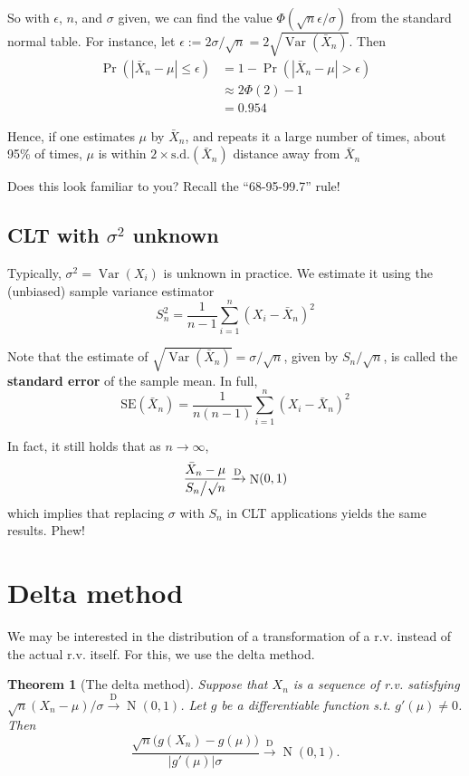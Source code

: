 \documentclass[
]{book}
\DeclareMathOperator{\Var}{Var}
\DeclareMathOperator{\N}{N}
\newtheorem{theorem}{Theorem}[chapter]
\theoremstyle{definition}
\theoremstyle{definition}
\theoremstyle{definition}
\theoremstyle{definition}
\theoremstyle{remark}
\begin{document}
So with \(\epsilon\), \(n\), and \(\sigma\) given, we can find the value \(\Phi(\sqrt{n}\epsilon/\sigma)\) from the standard normal table.
For instance, let \(\epsilon := 2\sigma/\sqrt{n} = 2 \sqrt{\Var(\bar X_n)}\).
Then
\[
\begin{aligned}
\Pr(|\bar X_n-\mu| \leq \epsilon) 
&= 1 - \Pr(|\bar X_n-\mu| > \epsilon) \\
&\approx 2\Phi(2) - 1\\
&=0.954
\end{aligned}
\]

Hence, if one estimates \(\mu\) by \(\bar X_n\), and repeats it a large number of times, about 95\% of times, \(\mu\) is within \(2 \times \text{s.d.}(\bar X_n)\) distance away from \(\bar X_n\)

Does this look familiar to you? Recall the ``68-95-99.7'' rule!

\hypertarget{clt-with-sigma2-unknown}{%
\subsection{\texorpdfstring{CLT with \(\sigma^2\) unknown}{CLT with \textbackslash sigma\^{}2 unknown}}\label{clt-with-sigma2-unknown}}

Typically, \(\sigma^2 = \Var(X_i)\) is unknown in practice.
We estimate it using the (unbiased) sample variance estimator
\[S_n^2 = \frac{1}{n-1} \sum_{i=1}^n (X_i - \bar X_n)^2\]

Note that the estimate of \(\sqrt{\Var(\bar X_n)} = \sigma/\surd n\), given by \(S_n/\surd n\), is called the \textbf{standard error} of the sample mean.
In full,
\[\text{SE}(\bar X_n) = \frac{1}{n(n-1)}\sum_{i=1}^n (X_i - \bar X_n)^2\]

In fact, it still holds that as \(n\to\infty\),
\[\frac{\bar X_n - \mu}{S_n\big/\surd n} \xrightarrow{\text D} \N(0,1)\]
which implies that replacing \(\sigma\) with \(S_n\) in CLT applications yields the same results. Phew!

\hypertarget{delta-method}{%
\section{Delta method}\label{delta-method}}

We may be interested in the distribution of a transformation of a r.v. instead of the actual r.v. itself.
For this, we use the delta method.

\begin{theorem}[The delta method]
Suppose that \(X_n\) is a sequence of r.v. satisfying \(\sqrt n(X_n - \mu)/\sigma {\xrightarrow{\text{D}}} \N(0,1)\).
Let \(g\) be a differentiable function s.t. \(g'(\mu)\neq 0\). Then
\[
\frac{\sqrt n \big(g(X_n)-g(\mu)\big)}{|g'(\mu)|\sigma} {\xrightarrow{\text{D}}} \N(0,1).
\]
\end{theorem}
\end{document}
